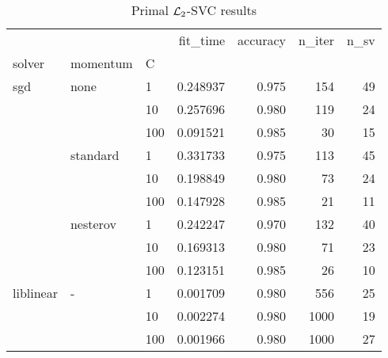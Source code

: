 \begin{table}[H]
\centering
\caption{Primal $\protect \mathcal{L}_2$-SVC results}
\label{primal_l2_svc_cv_results}
\begin{tabular}{lllrrrr}
\toprule
          &   &     &  fit\_time &  accuracy &  n\_iter &  n\_sv \\
solver & momentum & C &           &           &         &       \\
\midrule
sgd & none & 1   &  0.248937 &     0.975 &     154 &    49 \\
          &   & 10  &  0.257696 &     0.980 &     119 &    24 \\
          &   & 100 &  0.091521 &     0.985 &      30 &    15 \\
          & standard & 1   &  0.331733 &     0.975 &     113 &    45 \\
          &   & 10  &  0.198849 &     0.980 &      73 &    24 \\
          &   & 100 &  0.147928 &     0.985 &      21 &    11 \\
          & nesterov & 1   &  0.242247 &     0.970 &     132 &    40 \\
          &   & 10  &  0.169313 &     0.980 &      71 &    23 \\
          &   & 100 &  0.123151 &     0.985 &      26 &    10 \\
liblinear & - & 1   &  0.001709 &     0.980 &     556 &    25 \\
          &   & 10  &  0.002274 &     0.980 &    1000 &    19 \\
          &   & 100 &  0.001966 &     0.980 &    1000 &    27 \\
\bottomrule
\end{tabular}
\end{table}
